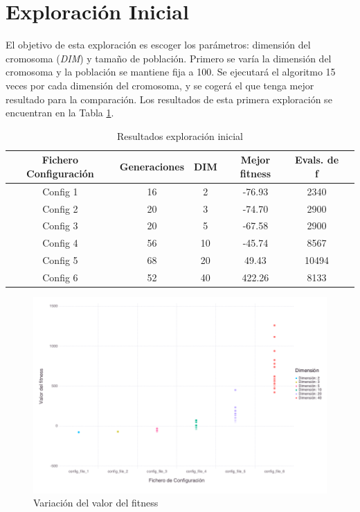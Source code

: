 \section{Exploración Inicial}

El objetivo de esta exploración es escoger los parámetros: dimensión del cromosoma (\textit{DIM}) y tamaño de población. Primero se varía la dimensión
del cromosoma y la población se mantiene fija a 100. Se ejecutará el algoritmo 15 veces por cada dimensión del cromosoma, y se cogerá el que 
tenga mejor resultado para la comparación. Los resultados de esta primera exploración se encuentran en la Tabla \ref{tab:fitness_variation}. 

\begin{table}[]
    \centering
    \begin{tabular}{||c|c|c|c|c|c||}
        \hline
        \textbf{Fichero Configuración} & \textbf{Generaciones} & \textbf{DIM} & \textbf{Mejor fitness} & \textbf{Evals. de f}\\ \hline
        Config 1   & 16    & 2   & -76.93    &  2340  \\ \hline
        Config 2   & 20    & 3   & -74.70    &  2900  \\ \hline
        Config 3   & 20    & 5   & -67.58    &  2900  \\ \hline
        Config 4   & 56    & 10  & -45.74    &  8567  \\ \hline
        Config 5   & 68    & 20  & 49.43     &  10494 \\ \hline
        Config 6   & 52    & 40  & 422.26    &  8133  \\ \hline
    \end{tabular}
    \caption{Resultados exploración inicial}
    \label{tab:fitness_variation}
\end{table}

\begin{figure}[]
	\centering	
	\includegraphics[scale=0.4]{figuras/config_file_1-6_Rastrigin_box_plots.png}
	\caption{ Variación del valor del fitness }
    \label{fig:box_plots}
\end{figure}

